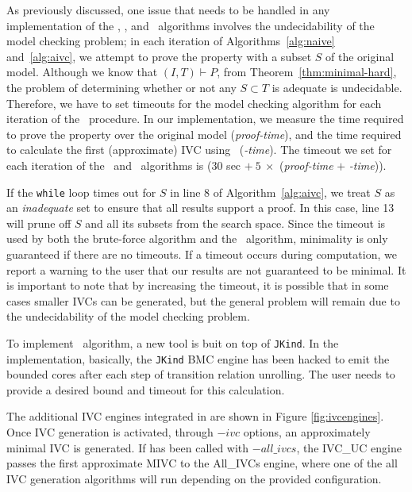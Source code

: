 As previously discussed, one issue that needs to
be handled in any implementation of the \ucalg, \ucbfalg, and \aivcalg~algorithms involves the undecidability of the model checking problem;
in each iteration of Algorithms~\ref{alg:naive} and~\ref{alg:aivc}, we attempt to prove the property with a subset $S$ of the original model.  Although we know that $(I, T) \vdash P$, from Theorem~\ref{thm:minimal-hard}, the problem of determining whether or not any $S \subset T$ is adequate is undecidable.
%
Therefore, we have to set timeouts for the model checking algorithm for each iteration of the \aivcalg\ procedure.
In our implementation, we measure the time required to prove the property over the original model (\emph{proof-time}), and the time required to calculate the first
(approximate) IVC using \ucalg\ (\emph{\ucalg-time}).
The timeout we set for each iteration of the \ucbfalg\ and \aivcalg\ algorithms is ($30$ sec  $+\ 5\ \times$ (\emph{proof-time} $+$ \emph{\ucalg-time})).

If the \texttt{while} loop times out for $S$ in line 8 of Algorithm~\ref{alg:aivc},
we treat $S$ as an \emph{inadequate} set to ensure that all results support a proof.
In this case, line 13 will prune off $S$ and all
its subsets from the search space.  Since the timeout is used by both the brute-force
algorithm and the \aivcalg\ algorithm, minimality is only guaranteed if there
are no timeouts.  If a timeout occurs during computation, we report a warning to the user that our results are not guaranteed to be minimal.
It is important to note that by increasing the timeout, it is possible that
in some cases smaller IVCs can be generated, but the general problem will remain due
to the undecidability of the model checking problem.

To implement \bvcalg\ algorithm, a new tool is buit on top of \texttt{JKind}. In the implementation, basically, the \texttt{JKind} BMC engine has been hacked to emit the bounded cores after each step of transition relation unrolling. The user needs to provide a desired bound and timeout for this calculation.

The additional IVC engines integrated in \jkind are shown in Figure \ref{fig:ivcengines}.
Once IVC generation is activated, through $-ivc$ options, an approximately minimal IVC is generated. If \jkind has been called with $-all\_ivcs$, the IVC\_UC engine passes the first approximate MIVC to the All\_IVCs engine, where one of the all IVC generation algorithms will run depending on the provided configuration.

